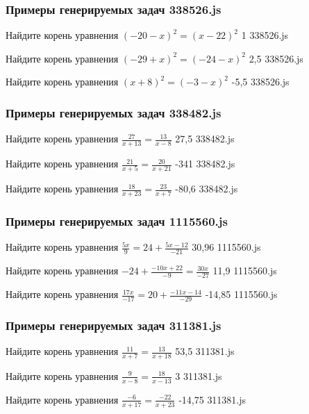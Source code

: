 
\subsubsection*{Примеры генерируемых задач 338526.js}   

\par{Найдите корень уравнения $(−20−x)^2=(x−22)^2$ }{ 1 }{338526.js}
\par{Найдите корень уравнения $(−29+x)^2=(−24−x)^2$ }{ 2,5 }{338526.js}
\par{Найдите корень уравнения $(x+8)^2=(−3−x)^2$ }{ -5,5 }{338526.js}


\subsubsection*{Примеры генерируемых задач 338482.js}   

\par{Найдите корень уравнения $\frac{27}{x+13}=\frac{13}{x−8}$ }{ 27,5 }{338482.js}
\par{Найдите корень уравнения $\frac{21}{x+5}=\frac{20}{x+21}$ }{ -341 }{338482.js}
\par{Найдите корень уравнения $\frac{18}{x+23}=\frac{23}{x+7}$ }{ -80,6 }{338482.js}


\subsubsection*{Примеры генерируемых задач 1115560.js}   

\par{Найдите корень уравнения $\frac{5x}{9}=24+\frac{5x−12}{−21}$ }{ 30,96 }{1115560.js}
\par{Найдите корень уравнения $-24+\frac{−10x+22}{−9}=\frac{30x}{−27}$ }{ 11,9 }{1115560.js}
\par{Найдите корень уравнения $\frac{17x}{−17}=20+\frac{−11x−14}{−29}$ }{ -14,85 }{1115560.js}


\subsubsection*{Примеры генерируемых задач 311381.js}   

\par{Найдите корень уравнения $\frac{11}{x+7}=\frac{13}{x+18}$ }{ 53,5 }{311381.js}
\par{Найдите корень уравнения $\frac{9}{x−8}=\frac{18}{x−13}$ }{ 3 }{311381.js}
\par{Найдите корень уравнения $\frac{−6}{x+17}=\frac{-22}{x+23}$ }{ -14,75 }{311381.js}
